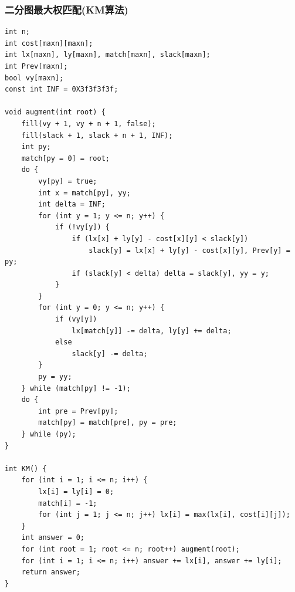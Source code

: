 \documentclass[twoside]{article}
\begin{document}
\subsubsection{二分图最大权匹配(KM算法)}
\begin{lstlisting}
int n;
int cost[maxn][maxn];
int lx[maxn], ly[maxn], match[maxn], slack[maxn];
int Prev[maxn];
bool vy[maxn];
const int INF = 0X3f3f3f3f;

void augment(int root) {
    fill(vy + 1, vy + n + 1, false);
    fill(slack + 1, slack + n + 1, INF);
    int py;
    match[py = 0] = root;
    do {
        vy[py] = true;
        int x = match[py], yy;
        int delta = INF;
        for (int y = 1; y <= n; y++) {
            if (!vy[y]) {
                if (lx[x] + ly[y] - cost[x][y] < slack[y])
                    slack[y] = lx[x] + ly[y] - cost[x][y], Prev[y] = py;
                if (slack[y] < delta) delta = slack[y], yy = y;
            }
        }
        for (int y = 0; y <= n; y++) {
            if (vy[y])
                lx[match[y]] -= delta, ly[y] += delta;
            else
                slack[y] -= delta;
        }
        py = yy;
    } while (match[py] != -1);
    do {
        int pre = Prev[py];
        match[py] = match[pre], py = pre;
    } while (py);
}

int KM() {
    for (int i = 1; i <= n; i++) {
        lx[i] = ly[i] = 0;
        match[i] = -1;
        for (int j = 1; j <= n; j++) lx[i] = max(lx[i], cost[i][j]);
    }
    int answer = 0;
    for (int root = 1; root <= n; root++) augment(root);
    for (int i = 1; i <= n; i++) answer += lx[i], answer += ly[i];
    return answer;
}\end{lstlisting}
\end{document}
